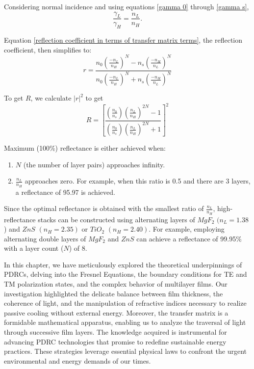 Considering normal incidence and using equations \ref{gamma 0} through \ref{gamma s},
\begin{equation}
    \frac{\gamma_L}{\gamma_H} = \frac{n_L}{n_H}.
\end{equation}

Equation \ref{reflection coefficient in terms of transfer matrix terms}, the reflection coefficient, then simplifies to:
    \begin{equation}\label{reflection coefficient for double high-reflectance layers}
    r = \frac{n_0\left(\frac{-n_L}{n_H}\right)^N - n_s\left(\frac{-n_H}{n_L}\right)^N}{n_0\left(\frac{-n_L}{n_H}\right)^N + n_s\left(\frac{-n_H}{n_L}\right)^N}
    \end{equation}

To get $R$, we calculate $|r|^2$ to get
    \begin{equation}\label{maximum reflectance equation}
    R = \left[ \frac{ \left( \frac{n_0}{n_s} \right) \left( \frac{n_L}{n_H} \right)^{2N}  - 1 }{  \left( \frac{n_0}{n_s} \right) \left( \frac{n_L}{n_H} \right)^{2N}  + 1     }  \right]^2
    \end{equation}

Maximum (100\%) reflectance is either achieved when:
    \begin{enumerate}
      \item $N$ (the number of layer pairs) approaches infinity.
      \item $\frac{n_L}{n_H}$ approaches zero. For example, when this ratio is 0.5 and there are 3 layers, a reflectance of 95.97 is achieved.
    \end{enumerate}
Since the optimal reflectance is obtained with the smallest ratio of $\frac{n_L}{n_H}$, high-reflectance stacks can be constructed using alternating layers of $MgF_2$ $(n_L = 1.38$) and $ZnS$ $(n_H = 2.35)$ or $TiO_2$ $(n_H = 2.40)$. For example, employing alternating double layers of $MgF_2$ and $ZnS$ can achieve a reflectance of 99.95\% with a layer count ($N$) of 8.

In this chapter, we have meticulously explored the theoretical underpinnings of PDRCs, delving into the Fresnel Equations, the boundary conditions for TE and TM polarization states, and the complex behavior of multilayer films. Our investigation highlighted the delicate balance between film thickness, the coherence of light, and the manipulation of refractive indices necessary to realize passive cooling without external energy. Moreover, the transfer matrix is a formidable mathematical apparatus, enabling us to analyze the traversal of light through successive film layers. The knowledge acquired is instrumental for advancing PDRC technologies that promise to redefine sustainable energy practices. These strategies leverage essential physical laws to confront the urgent environmental and energy demands of our times.
